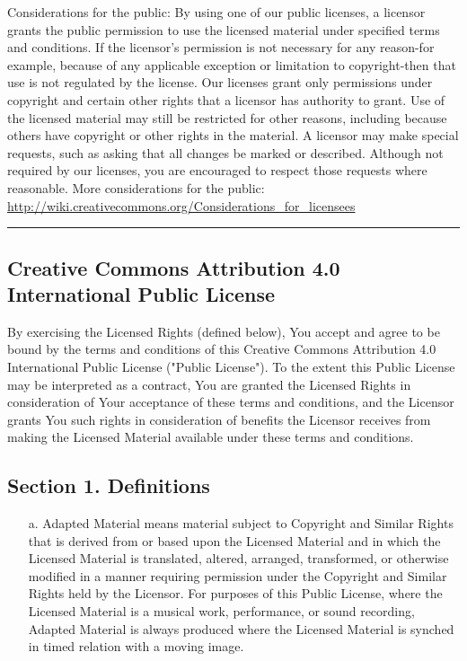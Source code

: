 \begin{scriptsize}
     Considerations for the public: By using one of our public
     licenses, a licensor grants the public permission to use the
     licensed material under specified terms and conditions. If
     the licensor's permission is not necessary for any reason-for
     example, because of any applicable exception or limitation to
     copyright-then that use is not regulated by the license. Our
     licenses grant only permissions under copyright and certain
     other rights that a licensor has authority to grant. Use of
     the licensed material may still be restricted for other
     reasons, including because others have copyright or other
     rights in the material. A licensor may make special requests,
     such as asking that all changes be marked or described.
     Although not required by our licenses, you are encouraged to
     respect those requests where reasonable. More considerations
     for the public:
	\url{http://wiki.creativecommons.org/Considerations_for_licensees}\\

\hrule

\subsection*{Creative Commons Attribution 4.0 International Public License}

By exercising the Licensed Rights (defined below), You accept and agree
to be bound by the terms and conditions of this Creative Commons
Attribution 4.0 International Public License ("Public License"). To the
extent this Public License may be interpreted as a contract, You are
granted the Licensed Rights in consideration of Your acceptance of
these terms and conditions, and the Licensor grants You such rights in
consideration of benefits the Licensor receives from making the
Licensed Material available under these terms and conditions.


\subsection*{Section 1. Definitions}

\begin{itemize}
  \item[a.] Adapted Material means material subject to Copyright and Similar
     Rights that is derived from or based upon the Licensed Material
     and in which the Licensed Material is translated, altered,
     arranged, transformed, or otherwise modified in a manner requiring
     permission under the Copyright and Similar Rights held by the
     Licensor. For purposes of this Public License, where the Licensed
     Material is a musical work, performance, or sound recording,
     Adapted Material is always produced where the Licensed Material is
     synched in timed relation with a moving image.


\end{itemize}
\end{scriptsize}
